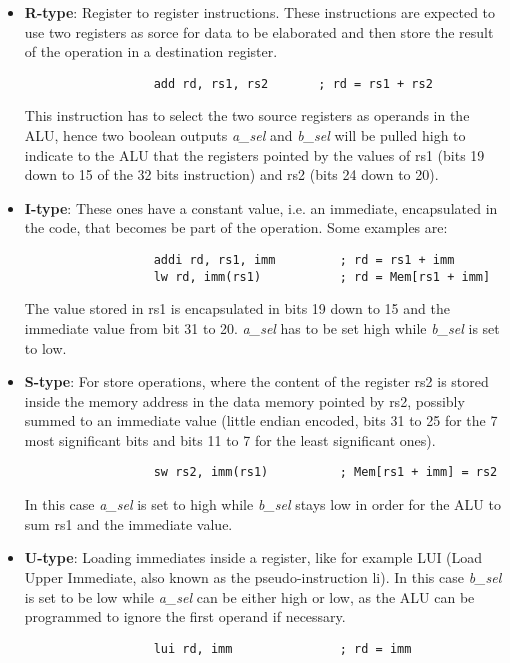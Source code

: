 \begin{itemize}
\item \textbf{R-type}: Register to register instructions. These instructions are expected to use two registers as sorce for data to be elaborated and then store the result of the operation in a destination register.
\begin{verbatim}
                  add rd, rs1, rs2       ; rd = rs1 + rs2
\end{verbatim}
This instruction has to select the two source registers as operands in the ALU, hence two boolean outputs \emph{a\_sel} and \emph{b\_sel} will be pulled high to indicate to the ALU that the registers pointed by the values of rs1 (bits 19 down to 15 of the 32 bits instruction) and rs2 (bits 24 down to 20).
\item \textbf{I-type}: These ones have a constant value, i.e. an immediate, encapsulated in the code, that becomes be part of the operation. Some examples are:
\begin{verbatim}
                  addi rd, rs1, imm         ; rd = rs1 + imm
                  lw rd, imm(rs1)           ; rd = Mem[rs1 + imm]
\end{verbatim}
The value stored in rs1 is encapsulated in bits 19 down to 15 and the immediate value from bit 31 to 20. \emph{a\_sel} has to be set high while \emph{b\_sel} is set to low.
\item \textbf{S-type}: For store operations, where the content of the register rs2 is stored inside the memory address in the data memory pointed by rs2, possibly summed to an immediate value (little endian encoded, bits 31 to 25 for the 7 most significant bits and bits 11 to 7 for the least significant ones). 
\begin{verbatim}
                  sw rs2, imm(rs1)          ; Mem[rs1 + imm] = rs2
\end{verbatim}
In this case \emph{a\_sel} is set to high while \emph{b\_sel} stays low in order for the ALU to sum rs1 and the immediate value.
\item \textbf{U-type}: Loading immediates inside a register, like for example LUI (Load Upper Immediate, also known as the pseudo-instruction li). In this case \emph{b\_sel} is set to be low while \emph{a\_sel} can be either high or low, as the ALU can be programmed to ignore the first operand if necessary.
\begin{verbatim}
                  lui rd, imm               ; rd = imm
\end{verbatim}
\end{itemize}
